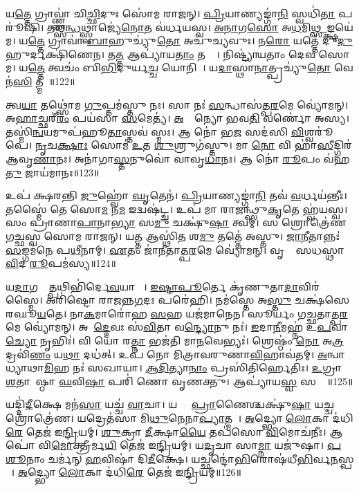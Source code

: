 𑌯\ul{𑌤𑍍𑌤𑍇} 𑌗𑍍𑌰𑌾𑌵𑍍𑌣𑍍𑌣𑌾॑ 𑌚𑌿\ul{𑌚𑍍𑌛𑌿}𑌦𑍁𑌃 𑌸𑍋॑𑌮 𑌰𑌾𑌜𑌨𑍍।
\ul{𑌪𑍍𑌰𑌿}𑌯𑌾𑌣𑍍𑌯𑌙𑍍𑌗𑌾॑\ul{𑌨𑌿} 𑌸𑍍𑌵𑌧𑌿॑\ul{𑌤𑌾} 𑌪𑌰𑍂॑𑌷𑌿।
𑌤𑌥𑍍𑌸\ul{𑌨𑍍𑌧}𑌥𑍍𑌸𑍍𑌵𑌾𑌜𑍍𑌯𑍇॑\ul{𑌨𑍋}𑌤 𑌵॑𑌰𑍍𑌧𑌯𑌸𑍍𑌵।
\ul{𑌅}\ul{𑌨𑌾}𑌗\ul{𑌸𑍋} 𑌅\ul{𑌧}𑌮𑌿\ul{𑌥𑍍𑌸}𑌙𑍍𑌕𑍍𑌷𑌯𑍇॑𑌮।
𑌯\ul{𑌤𑍍𑌤𑍇} 𑌗𑍍𑌰𑌾𑌵𑌾॑ \ul{𑌬𑌾}𑌹𑍁𑌚𑍍𑌯𑍁॑\ul{𑌤𑍋} 𑌅𑌚𑍁॑𑌚𑍍𑌯𑌵𑍁𑌃।
𑌨\ul{𑌰𑍋} 𑌯𑌤𑍍𑌤𑍇॑ 𑌦𑍁\ul{𑌦𑍁}𑌹𑍁𑌰𑍍𑌦𑌕𑍍𑌷𑌿॑𑌣𑍇𑌨।
𑌤\ul{𑌤𑍍𑌤} 𑌆𑌪𑍍𑌯𑌾॑𑌯\ul{𑌤𑌾𑌂} 𑌤𑌤𑍍𑌤𑍇᳚।
𑌨𑌿𑌷𑍍𑌟𑍍𑌯𑌾॑𑌯𑌤𑌾𑌂 𑌦𑍇𑌵 𑌸𑍋𑌮।
𑌯\ul{𑌤𑍍𑌤𑍇} 𑌤𑍍𑌵𑌚𑌂॑ 𑌬𑌿\ul{𑌭𑌿}𑌦𑍁𑌰𑍍𑌯\ul{𑌚𑍍𑌚} 𑌯𑍋𑌨𑌿𑌮𑍍᳚।
𑌯\ul{𑌦𑌾}𑌸𑍍𑌥𑌾\ul{𑌨𑌾}𑌤𑍍𑌪𑍍𑌰𑌚𑍍𑌯𑍁॑\ul{𑌤𑍋} 𑌵𑍇𑌨॑\ul{𑌸𑌿} 𑌤𑍍𑌮𑌨𑌾᳚॥122॥

𑌤𑍍𑌵\ul{𑌯𑌾} 𑌤𑌥𑍍𑌸𑍋॑𑌮 \ul{𑌗𑍁}𑌪𑍍𑌤𑌮॑𑌸𑍍𑌤𑍁 𑌨𑌃।
𑌸𑌾 𑌨𑌃॑ \ul{𑌸}𑌨𑍍𑌧𑌾𑌸॑𑌤𑍍𑌪\ul{𑌰}𑌮𑍇 𑌵𑍍𑌯𑍋॑𑌮𑌨𑍍।
𑌅\ul{𑌹𑌾}𑌚𑍍𑌛𑌰𑍀॑\ul{𑌰𑌂} 𑌪𑌯॑𑌸𑌾 \ul{𑌸}𑌮𑍇𑌤𑍍𑌯॑।
\ul{𑌅}𑌨𑍍𑌯𑍋᳚𑌨𑍍𑌯𑍋 𑌭𑌵\ul{𑌤𑌿} 𑌵𑌰𑍍𑌣𑍋॑ 𑌅𑌸𑍍𑌯।
𑌤𑌸𑍍𑌮𑌿॑\ul{𑌨𑍍𑌵}𑌯𑌮𑍁𑌪॑𑌹𑍂\ul{𑌤𑌾}𑌸𑍍𑌤𑌵॑ 𑌸𑍍𑌮𑌃।
𑌆 𑌨𑍋॑ 𑌭\ul{𑌜} 𑌸𑌦॑𑌸𑌿 \ul{𑌵𑌿}𑌶𑍍𑌵𑌰𑍂॑𑌪𑍇।
\ul{𑌨𑍃}𑌚\ul{𑌕𑍍𑌷𑌾𑌃} 𑌸𑍋𑌮॑ \ul{𑌉}𑌤 \ul{𑌶𑍁}𑌶𑍍𑌰𑍁𑌗॑𑌸𑍍𑌤𑍁।
𑌮𑌾 \ul{𑌨𑍋} 𑌵𑌿 𑌹𑌾॑\ul{𑌸𑍀}𑌦𑍍𑌗𑌿𑌰॑ 𑌆𑌵𑍃\ul{𑌣𑌾}𑌨𑌃।
𑌅𑌨𑌾॑𑌗𑌾\ul{𑌸𑍍𑌤}𑌨𑍁𑌵𑍋॑ 𑌵𑌾𑌵𑍃\ul{𑌧𑌾}𑌨𑌃।
𑌆 𑌨𑍋॑ \ul{𑌰𑍂}𑌪𑌂 𑌵॑𑌹\ul{𑌤𑍁} 𑌜𑌾𑌯॑𑌮𑌾𑌨𑌃॥123॥

𑌉𑌪॑ 𑌕𑍍𑌷𑌰𑌨𑍍𑌤𑌿 \ul{𑌜𑍁}𑌹𑍍𑌵𑍋॑ \ul{𑌘𑍃}𑌤𑍇𑌨॑।
\ul{𑌪𑍍𑌰𑌿}𑌯𑌾𑌣𑍍𑌯𑌙𑍍𑌗𑌾॑\ul{𑌨𑌿} 𑌤𑌵॑ \ul{𑌵}𑌰𑍍𑌧𑌯॑𑌨𑍍𑌤𑍀𑌃।
𑌤𑌸𑍍𑌮𑍈॑ 𑌤𑍇 𑌸𑍋\ul{𑌮} 𑌨\ul{𑌮} 𑌇𑌦𑍍𑌵𑌷॑𑌟𑍍𑌚।
𑌉𑌪॑ 𑌮𑌾 𑌰𑌾𑌜𑌨𑍍𑌥𑍍𑌸𑍁\ul{𑌕𑍃}𑌤𑍇 𑌹𑍍𑌵॑𑌯𑌸𑍍𑌵।
𑌸𑌂 𑌪𑍍𑌰𑌾॑𑌣𑌾\ul{𑌪𑌾}𑌨𑌾\ul{𑌭𑍍𑌯𑌾}\ul{} 𑌸\ul{𑌮𑍁} 𑌚𑌕𑍍𑌷𑍁॑\ul{𑌷𑌾} 𑌤𑍍𑌵𑌮𑍍।
𑌸 𑌶𑍍𑌰𑍋𑌤𑍍𑌰𑍇॑𑌣 𑌗𑌚𑍍𑌛𑌸𑍍𑌵 𑌸𑍋𑌮 𑌰𑌾𑌜𑌨𑍍।
𑌯\ul{𑌤𑍍𑌤} 𑌆𑌸𑍍𑌥𑌿॑\ul{𑌤}\ul{} 𑌶\ul{𑌮𑍁} 𑌤𑌤𑍍𑌤𑍇॑ 𑌅𑌸𑍍𑌤𑍁।
\ul{𑌜𑌾}\ul{𑌨𑍀}𑌤𑌾𑌨𑍍𑌨𑌃॑ \ul{𑌸}𑌙𑍍𑌗𑌮॑𑌨𑍇 𑌪\ul{𑌥𑍀}𑌨𑌾𑌮𑍍।
\ul{𑌏}𑌤𑌂 𑌜𑌾॑𑌨𑍀𑌤𑌾𑌤𑍍𑌪\ul{𑌰}𑌮𑍇 𑌵𑍍𑌯𑍋॑𑌮𑌨𑍍।
𑌵𑍃𑌕𑌾𑌃᳚ 𑌸𑌧𑌸𑍍𑌥𑌾 \ul{𑌵𑌿}𑌦 \ul{𑌰𑍂}𑌪𑌮॑𑌸𑍍𑌯॥124॥

𑌯\ul{𑌦𑌾}𑌗𑌚𑍍𑌛𑌾᳚\ul{𑌤𑍍𑌪}𑌥𑌿𑌭𑌿॑𑌰𑍍𑌦𑍇\ul{𑌵}𑌯𑌾𑌨𑍈𑌃᳚।
\ul{𑌇}\ul{𑌷𑍍𑌟𑌾}\ul{𑌪𑍂}𑌰𑍍𑌤𑍇 𑌕𑍃॑𑌣𑍁𑌤𑌾\ul{𑌦𑌾}𑌵𑌿𑌰॑𑌸𑍍𑌮𑍈।
𑌅𑌰𑌿॑𑌷𑍍𑌟𑍋 𑌰𑌾𑌜𑌨𑍍𑌨\ul{𑌗}𑌦𑌃 𑌪𑌰𑍇॑𑌹𑌿।
𑌨𑌮॑𑌸𑍍𑌤𑍇 𑌅\ul{𑌸𑍍𑌤𑍁} 𑌚𑌕𑍍𑌷॑𑌸𑍇 𑌰𑌘𑍂\ul{𑌯}𑌤𑍇।
𑌨𑌾\ul{𑌕}𑌮𑌾𑌰𑍋॑𑌹 \ul{𑌸}𑌹 𑌯𑌜॑𑌮𑌾𑌨𑍇𑌨।
𑌸𑍂𑌰𑍍𑌯𑌂॑ 𑌗𑌚𑍍𑌛𑌤𑌾𑌤𑍍𑌪\ul{𑌰}𑌮𑍇 𑌵𑍍𑌯𑍋॑𑌮𑌨𑍍।
𑌅𑌭𑍂᳚\ul{𑌦𑍍𑌦𑍇}𑌵𑌃 𑌸॑\ul{𑌵𑌿}𑌤𑌾 𑌵\ul{𑌨𑍍𑌦𑍍𑌯𑍋}𑌨𑍁 𑌨𑌃॑।
\ul{𑌇}𑌦𑌾\ul{𑌨𑍀}𑌮𑌹𑍍𑌨॑ 𑌉\ul{𑌪}𑌵𑌾\ul{𑌚𑍍𑌯𑍋} 𑌨𑍃𑌭𑌿𑌃॑।
𑌵𑌿 𑌯𑍋 𑌰\ul{𑌤𑍍𑌨𑌾} 𑌭𑌜॑𑌤𑌿 𑌮𑌾\ul{𑌨}𑌵𑍇𑌭𑍍𑌯𑌃॑।
𑌶𑍍𑌰𑍇𑌷𑍍𑌠𑌂॑ \ul{𑌨𑍋} 𑌅\ul{𑌤𑍍𑌰} 𑌦𑍍𑌰𑌵𑌿॑\ul{𑌣𑌂} 𑌯\ul{𑌥𑌾} 𑌦𑌧॑𑌤𑍍।
𑌉𑌪॑ 𑌨𑍋 𑌮𑌿𑌤𑍍𑌰𑌾𑌵𑌰𑍁𑌣𑌾\ul{𑌵𑌿}𑌹𑌾𑌵॑𑌤𑌮𑍍।
\ul{𑌅}𑌨𑍍𑌵𑌾𑌦𑍀᳚𑌧𑍍𑌯𑌾𑌥𑌾\ul{𑌮𑌿}𑌹 𑌨𑌃॑ 𑌸𑌖𑌾𑌯𑌾।
\ul{𑌆}\ul{𑌦𑌿}𑌤𑍍𑌯𑌾\ul{𑌨𑌾𑌂} 𑌪𑍍𑌰𑌸𑌿॑𑌤𑌿𑌰𑍍\mbox{}\ul{𑌹𑍇}𑌤𑌿𑌃।
\ul{𑌉}𑌗𑍍𑌰𑌾 \ul{𑌶}𑌤𑌾𑌪𑌾᳚𑌷𑍍𑌠𑌾 \ul{𑌘}𑌵𑌿\ul{𑌷𑌾} 𑌪𑌰𑌿॑ 𑌣𑍋 𑌵𑍃𑌣𑌕𑍍𑌤𑍁।
𑌆𑌪𑍍𑌯𑌾॑𑌯\ul{𑌸𑍍𑌵} 𑌸𑌨𑍍𑌤𑍇᳚॥125॥\anuvakamend[𑌤𑍍𑌮\ul{𑌨𑌾} 𑌜𑌾𑌯॑𑌮𑌾𑌨𑍋\-𑌽\ul{𑌸𑍍𑌯} 𑌦\ul{𑌧}𑌤𑍍𑌪𑌞𑍍𑌚॑ 𑌚]

𑌯𑌦𑍍𑌦𑌿॑\ul{𑌦𑍀}𑌕𑍍𑌷𑍇 𑌮𑌨॑\ul{𑌸𑌾} 𑌯𑌚𑍍𑌚॑ \ul{𑌵𑌾}𑌚𑌾।
𑌯𑌦𑍍𑌵𑌾᳚ \ul{𑌪𑍍𑌰𑌾}𑌣𑍈𑌶𑍍𑌚𑌕𑍍𑌷𑍁॑\ul{𑌷𑌾} 𑌯\ul{𑌚𑍍𑌚} 𑌶𑍍𑌰𑍋𑌤𑍍𑌰𑍇॑𑌣।
𑌯𑌦𑍍𑌰𑍇𑌤॑𑌸𑌾 𑌮𑌿\ul{𑌥𑍁}𑌨𑍇𑌨𑌾\ul{𑌪𑍍𑌯𑌾}𑌤𑍍𑌮𑌨𑌾᳚।
\ul{𑌅}𑌦𑍍𑌭𑍍𑌯𑍋 \ul{𑌲𑍋}𑌕𑌾 𑌦॑𑌧𑌿\ul{𑌰𑍇} 𑌤𑍇𑌜॑ 𑌇\ul{𑌨𑍍𑌦𑍍𑌰𑌿}𑌯𑌮𑍍।
\ul{𑌶𑍁}𑌕𑍍𑌰𑌾 \ul{𑌦𑍀}𑌕𑍍𑌷𑌾\ul{𑌯𑍈} 𑌤𑌪॑𑌸𑍋 \ul{𑌵𑌿}𑌮𑍋𑌚॑𑌨𑍀𑌃।
𑌆𑌪𑍋॑ 𑌵𑌿\ul{𑌮𑍋}𑌕𑍍𑌤𑍍𑌰𑍀𑌰𑍍𑌮\ul{𑌯𑌿} 𑌤𑍇𑌜॑ 𑌇\ul{𑌨𑍍𑌦𑍍𑌰𑌿}𑌯𑌮𑍍।
𑌯\ul{𑌦𑍃}𑌚𑌾 𑌸𑌾\ul{𑌮𑍍𑌨𑌾} 𑌯𑌜𑍁॑𑌷𑌾।
\ul{𑌪}\ul{𑌶𑍂}𑌨𑌾𑌂 𑌚𑌰𑍍𑌮॑𑌨𑍍 \ul{𑌹}𑌵𑌿𑌷𑌾॑ 𑌦𑌿\ul{𑌦𑍀}𑌕𑍍𑌷𑍇।
𑌯𑌚𑍍𑌛𑌨𑍍𑌦𑍋॑\ul{𑌭𑌿}𑌰𑍋𑌷॑𑌧𑍀\ul{𑌭𑌿}𑌰𑍍𑌵\ul{𑌨}𑌸𑍍𑌪𑌤𑍗᳚।
\ul{𑌅}𑌦𑍍𑌭𑍍𑌯𑍋 \ul{𑌲𑍋}𑌕𑌾 𑌦॑𑌧𑌿\ul{𑌰𑍇} 𑌤𑍇𑌜॑ 𑌇\ul{𑌨𑍍𑌦𑍍𑌰𑌿}𑌯𑌮𑍍॥126॥

